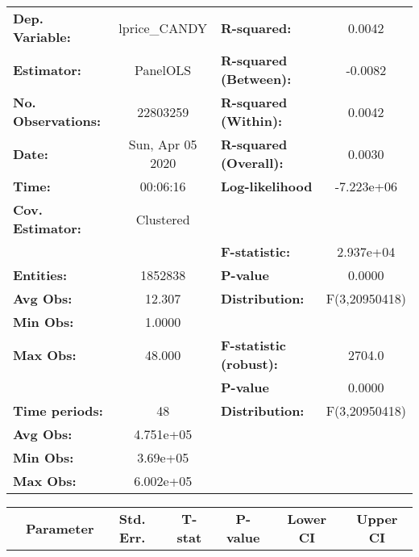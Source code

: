 \documentclass{report}
\begin{document}
\begin{center}
\begin{tabular}{lclc}
\toprule
\textbf{Dep. Variable:}    &   lprice\_CANDY    & \textbf{  R-squared:         }   &      0.0042      \\
\textbf{Estimator:}        &      PanelOLS      & \textbf{  R-squared (Between):}  &     -0.0082      \\
\textbf{No. Observations:} &      22803259      & \textbf{  R-squared (Within):}   &      0.0042      \\
\textbf{Date:}             &  Sun, Apr 05 2020  & \textbf{  R-squared (Overall):}  &      0.0030      \\
\textbf{Time:}             &      00:06:16      & \textbf{  Log-likelihood     }   &    -7.223e+06    \\
\textbf{Cov. Estimator:}   &     Clustered      & \textbf{                     }   &                  \\
\textbf{}                  &                    & \textbf{  F-statistic:       }   &    2.937e+04     \\
\textbf{Entities:}         &      1852838       & \textbf{  P-value            }   &      0.0000      \\
\textbf{Avg Obs:}          &       12.307       & \textbf{  Distribution:      }   &  F(3,20950418)   \\
\textbf{Min Obs:}          &       1.0000       & \textbf{                     }   &                  \\
\textbf{Max Obs:}          &       48.000       & \textbf{  F-statistic (robust):} &      2704.0      \\
\textbf{}                  &                    & \textbf{  P-value            }   &      0.0000      \\
\textbf{Time periods:}     &         48         & \textbf{  Distribution:      }   &  F(3,20950418)   \\
\textbf{Avg Obs:}          &     4.751e+05      & \textbf{                     }   &                  \\
\textbf{Min Obs:}          &      3.69e+05      & \textbf{                     }   &                  \\
\textbf{Max Obs:}          &     6.002e+05      & \textbf{                     }   &                  \\
\bottomrule
\end{tabular}
\begin{tabular}{lcccccc}
                           & \textbf{Parameter} & \textbf{Std. Err.} & \textbf{T-stat} & \textbf{P-value} & \textbf{Lower CI} & \textbf{Upper CI}  \\

\end{tabular}
\end{center}
\end{document}

